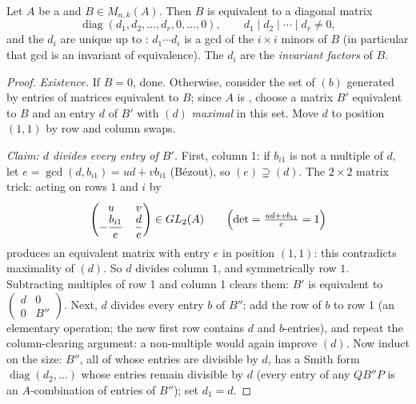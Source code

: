 \begin{theorem}\label{thm:b3:modules:smith}
Let $A$ be a  and $B \in M_{n,k}(A)$. Then $B$ is equivalent to
a diagonal matrix
\[
\operatorname{diag}(d_1, d_2, \dots, d_r, 0, \dots, 0),
\qquad d_1 \mid d_2 \mid \cdots \mid d_r \neq 0 ,
\]
and the $d_i$ are unique up to : $d_1 \cdots d_i$ is a
gcd of the $i \times i$ minors of $B$ (in particular that gcd is
an invariant of equivalence). The $d_i$ are the \emph{invariant
factors} of $B$.
\end{theorem}

\begin{proof}
\emph{Existence.} If $B = 0$, done. Otherwise, consider the set of
 $(b)$ generated by entries of matrices equivalent to $B$;
since $A$ is , choose a matrix $B'$ equivalent to $B$
and an entry $d$ of $B'$ with $(d)$ \emph{maximal} in this set.
Move $d$ to position $(1,1)$ by row and column swaps.

\emph{Claim: $d$ divides every entry of $B'$.} First, column 1: if
$b_{i1}$ is not a multiple of $d$, let $e = \gcd(d, b_{i1}) = ud +
vb_{i1}$ (B\'ezout), so $(e) \supsetneq (d)$. The $2 \times 2$
matrix trick: acting on rows $1$ and $i$ by
\[
\begin{pmatrix} u & v \\ -\dfrac{b_{i1}}e & \dfrac de
\end{pmatrix}
\in GL_2(A)
\qquad
\Bigl(\det = \tfrac{ud + v b_{i1}}e = 1\Bigr)
\]
produces an equivalent matrix with entry $e$ in position $(1,1)$:
this contradicts maximality of $(d)$. So $d$ divides column $1$,
and symmetrically row $1$. Subtracting multiples of row 1 and
column 1 clears them: $B'$ is equivalent to $\begin{pmatrix} d &
0\\ 0 & B''\end{pmatrix}$. Next, $d$ divides every entry $b$ of
$B''$: add the row of $b$ to row 1 (an elementary operation; the
new first row contains $d$ and $b$-entries), and repeat the
column-clearing argument: a non-multiple would again improve
$(d)$. Now induct on the size: $B''$, all of whose entries are
divisible by $d$, has a Smith form $\operatorname{diag}(d_2,
\dots)$ whose entries remain divisible by $d$ (every entry of any
$QB''P$ is an $A$-combination of entries of $B''$); set $d_1 =
d$.


\end{proof}
